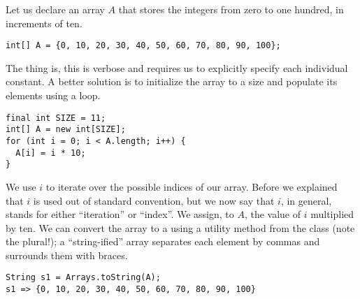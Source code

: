 \example Let us declare an array $A$ that stores the integers from zero to one hundred, in increments of ten.
\begin{verbatim}
int[] A = {0, 10, 20, 30, 40, 50, 60, 70, 80, 90, 100};
\end{verbatim}
The thing is, this is verbose and requires us to explicitly specify each individual constant. A better solution is to initialize the array to a size and populate its elements using a loop.
\begin{verbatim}
final int SIZE = 11;
int[] A = new int[SIZE];
for (int i = 0; i < A.length; i++) {
  A[i] = i * 10;
}
\end{verbatim}
We use $i$ to iterate over the possible indices of our array. Before we explained that $i$ is used out of standard convention, but we now say that $i$, in general, stands for either ``iteration'' or ``index''. We assign, to $A$, the value of $i$ multiplied by ten. We can convert the array to a  using a utility method from the  class (note the plural!); a ``string-ified'' array separates each element by commas and surrounds them with braces.
\begin{verbatim}
String s1 = Arrays.toString(A);
s1 => {0, 10, 20, 30, 40, 50, 60, 70, 80, 90, 100}
\end{verbatim}


